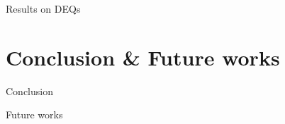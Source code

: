 \documentclass[aspectratio=169,xcolor=dvipsnames]{beamer}
\begin{document}
\begin{frame}{Results on DEQs}

\end{frame}

\section{Conclusion \& Future works}

\begin{frame}{Conclusion}
\end{frame}

\begin{frame}{Future works}
\end{frame}
\end{document}
